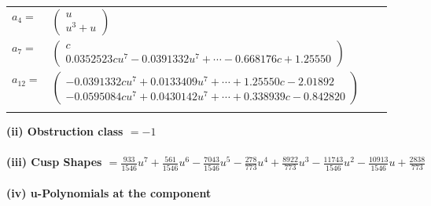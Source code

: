 \documentclass[1p]{elsarticle_modified}
\theoremstyle{definition}
\begin{document}
\begin{tabular}{m{7pt} m{180pt} m{7pt} m{180pt} }
\flushright $a_{4}=$&$\begin{pmatrix}u\\u^3+u\end{pmatrix}$ \\
\flushright $a_{7}=$&$\begin{pmatrix}c\\0.0352523 c u^{7}-0.0391332 u^{7}+\cdots-0.668176 c+1.25550\end{pmatrix}$ \\
\flushright $a_{12}=$&$\begin{pmatrix}-0.0391332 c u^{7}+0.0133409 u^{7}+\cdots+1.25550 c-2.01892\\-0.0595084 c u^{7}+0.0430142 u^{7}+\cdots+0.338939 c-0.842820\end{pmatrix}$\\&\end{tabular}
\flushleft \textbf{(ii) Obstruction class $= -1$}\\~\\
\flushleft \textbf{(iii) Cusp Shapes $= \frac{933}{1546} u^7+\frac{561}{1546} u^6-\frac{7043}{1546} u^5-\frac{278}{773} u^4+\frac{8922}{773} u^3-\frac{11743}{1546} u^2-\frac{10913}{1546} u+\frac{2838}{773}$}\\~\\
\newpage\renewcommand{\arraystretch}{1}
\flushleft \textbf{(iv) u-Polynomials at the component}\newline \\
\end{document}
